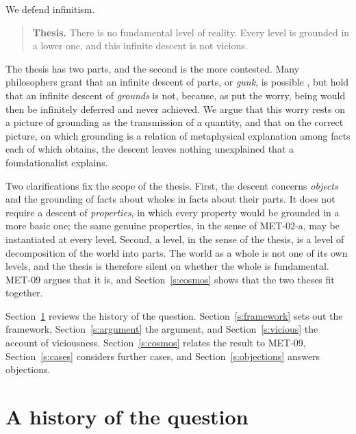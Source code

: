 \documentclass{situationist-preprint}
\begin{document}
We defend infinitism.

\begin{quote}
\textbf{Thesis.} There is no fundamental level of reality. Every level is grounded in a lower one, and this infinite descent is not vicious.
\end{quote}

The thesis has two parts, and the second is the more contested. Many philosophers grant that an infinite descent of parts, or \emph{gunk}, is possible \citep{Lewis1991,Zimmerman1996}, but hold that an infinite descent of \emph{grounds} is not, because, as \citet{Schaffer2010} put the worry, being would then be infinitely deferred and never achieved. We argue that this worry rests on a picture of grounding as the transmission of a quantity, and that on the correct picture, on which grounding is a relation of metaphysical explanation among facts each of which obtains, the descent leaves nothing unexplained that a foundationalist explains.

Two clarifications fix the scope of the thesis. First, the descent concerns \emph{objects} and the grounding of facts about wholes in facts about their parts. It does not require a descent of \emph{properties}, in which every property would be grounded in a more basic one; the same genuine properties, in the sense of MET-02-a, may be instantiated at every level. Second, a level, in the sense of the thesis, is a level of decomposition of the world into parts. The world as a whole is not one of its own levels, and the thesis is therefore silent on whether the whole is fundamental. MET-09 argues that it is, and Section~\ref{s:cosmos} shows that the two theses fit together.

Section~\ref{s:history} reviews the history of the question. Section~\ref{s:framework} sets out the framework, Section~\ref{s:argument} the argument, and Section~\ref{s:vicious} the account of viciousness. Section~\ref{s:cosmos} relates the result to MET-09, Section~\ref{s:cases} considers further cases, and Section~\ref{s:objections} answers objections.

\section{A history of the question}\label{s:history}
\end{document}
